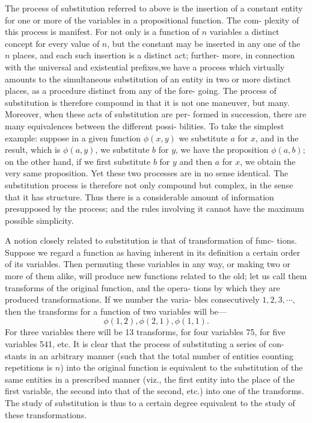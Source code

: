 \documentclass[10pt, twoside]{extarticle}
\theoremstyle{breaktheorem}
\theoremstyle{mylemma}
\theoremstyle{mydefinition}
\theoremstyle{mycorollary}
\begin{document}
The process of substitution referred to above is the insertion of a constant
entity for one or more of the variables in a propositional function. The com-
plexity of this process is manifest. For not only is a function of \(n\) variables
a distinct concept for every value of \(n\), but the constant may be inserted in
any one of the \(n\) places, and each such insertion is a distinct act; further-
more, in connection with the universal and existential prefixes,we have a
process which virtually amounts to the simultaneous substitution of an entity
in two or more distinct places, as a procedure distinct from any of the fore-
going. The process of substitution is therefore compound in that it is not
one maneuver, but many. Moreover, when these acts of substitution are per-
formed in succession, there are many equivalences between the different possi-
bilities. To take the simplest example: suppose in a given function \(\phi(x, y)\)
we substitute \(a\) for \(x\), and in the result, which is \(\phi(a, y)\), we substitute \(b\) for \(y\),
 we have the proposition \(\phi(a, b)\); on the other hand, if we first substitute \(b\)
for \(y\) and then \(a\) for \(x\), we obtain the very same proposition. Yet these two
processes are in no sense identical. The substitution process is therefore not
only compound but complex, in the sense that it has structure. Thus there
is a considerable amount of information presupposed by the process; and
the rules involving it cannot have the maximum possible simplicity.

A notion closely related to substitution is that of transformation of func-
tions. Suppose we regard a function as having inherent in its definition a
certain order of its variables. Then permuting these variables in any way,
or making two or more of them alike, will produce new functions related to
the old; let us call them transforms of the original function, and the opera-
tions by which they are produced transformations. If we number the varia-
bles consecutively \(1, 2, 3, \cdots,\) then the transforms for a function of two
variables will be---
\[\phi(1, 2), \phi(2, 1), \phi(1, 1).\]
For three variables there will be 13 transforms, for four variables 75, for five
variables 541, etc. It is clear that the process of substituting a series of con-
stants in an arbitrary manner (such that the total number of entities counting
repetitions is \(n\)) into the original function is equivalent to the substitution of
the same entities in a prescribed manner (viz., the first entity into the place
of the first variable, the second into that of the second, etc.) into one of the
transforms. The study of substitution is thus to a certain degree equivalent
to the study of these transformations.
\end{document}
